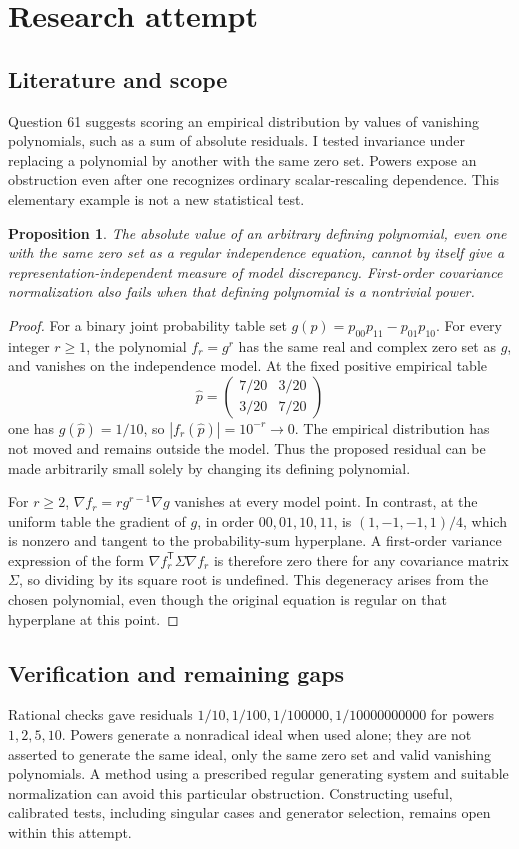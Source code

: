 \documentclass[11pt]{article}
\newtheorem{proposition}{Proposition}
\begin{document}
\section{Research attempt}
\subsection{Literature and scope}
Question 61 suggests scoring an empirical distribution by values of vanishing polynomials, such as a sum of absolute residuals. I tested invariance under replacing a polynomial by another with the same zero set. Powers expose an obstruction even after one recognizes ordinary scalar-rescaling dependence. This elementary example is not a new statistical test.
\begin{proposition}
The absolute value of an arbitrary defining polynomial, even one with the same zero set as a regular independence equation, cannot by itself give a representation-independent measure of model discrepancy. First-order covariance normalization also fails when that defining polynomial is a nontrivial power.
\end{proposition}
\begin{proof}
For a binary joint probability table set $g(p)=p_{00}p_{11}-p_{01}p_{10}$. For every integer $r\ge1$, the polynomial $f_r=g^r$ has the same real and complex zero set as $g$, and vanishes on the independence model. At the fixed positive empirical table
\[
\widehat p=\begin{pmatrix}7/20&3/20\\3/20&7/20\end{pmatrix}
\]
one has $g(\widehat p)=1/10$, so $|f_r(\widehat p)|=10^{-r}\longrightarrow0$. The empirical distribution has not moved and remains outside the model. Thus the proposed residual can be made arbitrarily small solely by changing its defining polynomial.

For $r\ge2$, $\nabla f_r=r g^{r-1}\nabla g$ vanishes at every model point. In contrast, at the uniform table the gradient of $g$, in order $00,01,10,11$, is $(1,-1,-1,1)/4$, which is nonzero and tangent to the probability-sum hyperplane. A first-order variance expression of the form $\nabla f_r^{\mathsf T}\Sigma\nabla f_r$ is therefore zero there for any covariance matrix $\Sigma$, so dividing by its square root is undefined. This degeneracy arises from the chosen polynomial, even though the original equation is regular on that hyperplane at this point.
\end{proof}
\subsection{Verification and remaining gaps}
Rational checks gave residuals $1/10,1/100,1/100000,1/10000000000$ for powers $1,2,5,10$. Powers generate a nonradical ideal when used alone; they are not asserted to generate the same ideal, only the same zero set and valid vanishing polynomials. A method using a prescribed regular generating system and suitable normalization can avoid this particular obstruction. Constructing useful, calibrated tests, including singular cases and generator selection, remains open within this attempt.
\end{document}

